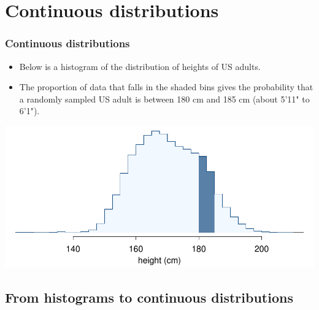 
\section{Continuous distributions}


\begin{frame}
\frametitle{Continuous distributions}

\begin{itemize}

\item Below is a histogram of the distribution of heights of US adults. 

\item The proportion of data that falls in the shaded bins gives the probability that a randomly sampled US adult is between 180 cm and 185 cm (about 5'11" to 6'1").

\end{itemize}

\begin{center}
\includegraphics[width=\textwidth]{2-5_continuous_distributions/figures/usHeightsHist180185/usHeightsHist180185}
\end{center}


\end{frame}


\subsection{From histograms to continuous distributions}

